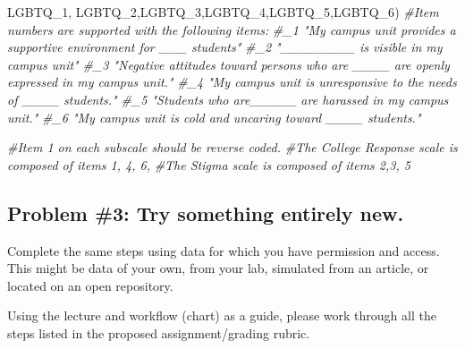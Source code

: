 \documentclass[
  english,
]{book}
\newenvironment{Shaded}{\begin{snugshade}}{\end{snugshade}}
\newcommand{\CommentTok}[1]{\textcolor[rgb]{0.56,0.35,0.01}{\textit{#1}}}
\newcommand{\NormalTok}[1]{#1}
\newcommand{\StringTok}[1]{\textcolor[rgb]{0.31,0.60,0.02}{#1}}
\begin{document}
\begin{Shaded}
\begin{Highlighting}[]
         \StringTok{\textquotesingle{}LGBTQ\_1\textquotesingle{}}\NormalTok{, }\StringTok{\textquotesingle{}LGBTQ\_2\textquotesingle{}}\NormalTok{,}\StringTok{\textquotesingle{}LGBTQ\_3\textquotesingle{}}\NormalTok{,}\StringTok{\textquotesingle{}LGBTQ\_4\textquotesingle{}}\NormalTok{,}\StringTok{\textquotesingle{}LGBTQ\_5\textquotesingle{}}\NormalTok{,}\StringTok{\textquotesingle{}LGBTQ\_6\textquotesingle{}}\NormalTok{)}
\CommentTok{\#Item numbers are supported with the following items:}
\CommentTok{\#\_1 "My campus unit provides a supportive environment for \_\_\_ students"}
\CommentTok{\#\_2 "\_\_\_\_\_\_\_\_ is visible in my campus unit"}
\CommentTok{\#\_3 "Negative attitudes toward persons who are \_\_\_\_ are openly expressed in my campus unit."}
\CommentTok{\#\_4 "My campus unit is unresponsive to the needs of \_\_\_\_ students."}
\CommentTok{\#\_5 "Students who are\_\_\_\_\_ are harassed in my campus unit."}
\CommentTok{\#\_6 "My campus unit is cold and uncaring toward \_\_\_\_ students."}

\CommentTok{\#Item 1 on each subscale should be reverse coded.}
\CommentTok{\#The College Response scale is composed of items 1, 4, 6, }
\CommentTok{\#The Stigma scale is composed of items 2,3, 5}
\end{Highlighting}
\end{Shaded}

\hypertarget{problem-3-try-something-entirely-new.-2}{%
\subsection{Problem \#3: Try something entirely new.}\label{problem-3-try-something-entirely-new.-2}}

Complete the same steps using data for which you have permission and access. This might be data of your own, from your lab, simulated from an article, or located on an open repository.

Using the lecture and workflow (chart) as a guide, please work through all the steps listed in the proposed assignment/grading rubric.
\end{document}
